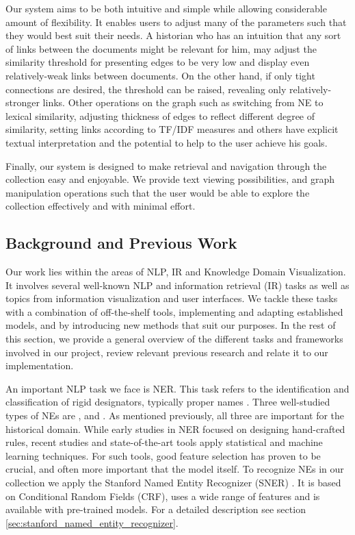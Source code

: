 Our system aims to be both intuitive and simple while allowing considerable amount of flexibility. It enables users to adjust many of the 
parameters such that they would best suit their needs. A historian who has an intuition that any sort of links between the documents might 
be relevant for him, may adjust the similarity threshold for presenting edges to be very low and display even relatively-weak links between documents. On the other hand, if only tight connections 
are desired, the threshold can be raised, revealing only relatively-stronger links. Other operations on the graph such as switching from NE to lexical similarity, adjusting 
thickness of edges to reflect different degree of similarity, setting links according to TF/IDF measures and others have explicit textual 
interpretation and the potential to help to the user achieve his goals. 

Finally, our system is designed to make retrieval and navigation through the collection easy and enjoyable. We provide text viewing 
possibilities, and graph manipulation operations such that the user would be able to explore the collection effectively and with minimal effort.

\subsection {Background and Previous Work}
\label{sec:nlp_background}

Our work lies within the areas of NLP, IR and Knowledge Domain Visualization.
It involves several well-known NLP and information retrieval (IR) tasks as well as topics from information visualization and user interfaces. 
We tackle these tasks with a combination of off-the-shelf tools, implementing and adapting established models, and by introducing new methods 
that suit our purposes. In the rest of this section, we provide a general overview of the different tasks and frameworks involved in our 
project, review relevant previous research and relate it to our implementation. 

An important NLP task we face is NER. This task refers to the identification and classification of rigid designators, 
typically proper names \cite{NEsurvey2009}. Three well-studied types of NEs are ,  and . 
As mentioned previously, all three are important for the historical domain. While early studies in NER focused on designing 
hand-crafted rules, recent studies and state-of-the-art tools apply statistical and machine learning techniques. For such tools, 
good feature selection has proven to be crucial, and often more important that the model itself.  
To recognize NEs in our collection we apply the Stanford Named Entity Recognizer (SNER) \cite{sner}. It is based on Conditional Random Fields (CRF), 
uses a wide range of features and is available with pre-trained models.  For a detailed description see section \ref{sec:stanford_named_entity_recognizer}.


